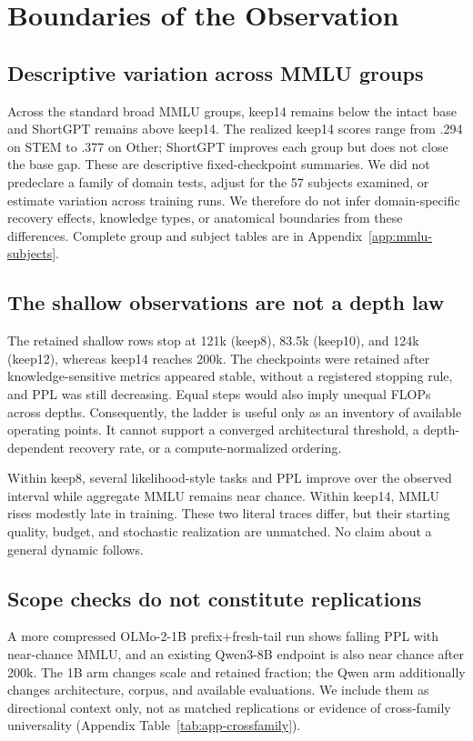 \section{Boundaries of the Observation}
\label{sec:analysis}

\subsection{Descriptive variation across MMLU groups}
Across the standard broad MMLU groups, keep14 remains below the intact base and
ShortGPT remains above keep14. The realized keep14 scores range from .294 on
STEM to .377 on Other; ShortGPT improves each group but does not close the
base gap. These are descriptive fixed-checkpoint summaries. We did not
predeclare a family of domain tests, adjust for the 57 subjects examined, or
estimate variation across training runs. We therefore do not infer
domain-specific recovery effects, knowledge types, or anatomical boundaries
from these differences. Complete group and subject tables are in
Appendix~\ref{app:mmlu-subjects}.

\subsection{The shallow observations are not a depth law}
The retained shallow rows stop at 121k (keep8), 83.5k (keep10), and 124k
(keep12), whereas keep14 reaches 200k. The checkpoints were retained after
knowledge-sensitive metrics appeared stable, without a registered stopping
rule, and PPL was still decreasing. Equal steps would also imply unequal FLOPs
across depths. Consequently, the ladder is useful only as an inventory of
available operating points. It cannot support a converged architectural
threshold, a depth-dependent recovery rate, or a compute-normalized ordering.

Within keep8, several likelihood-style tasks and PPL improve over the observed
interval while aggregate MMLU remains near chance. Within keep14, MMLU rises
modestly late in training. These two literal traces differ, but their starting
quality, budget, and stochastic realization are unmatched. No claim about a
general dynamic follows.

\subsection{Scope checks do not constitute replications}
A more compressed OLMo-2-1B prefix+fresh-tail run shows falling PPL with
near-chance MMLU, and an existing Qwen3-8B endpoint is also near chance after
200k. The 1B arm changes scale and retained fraction; the Qwen arm additionally
changes architecture, corpus, and available evaluations. We include them as
directional context only, not as matched replications or evidence of
cross-family universality (Appendix Table~\ref{tab:app-crossfamily}).

